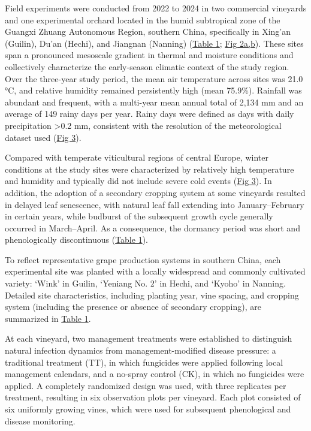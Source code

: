 \documentclass[
]{article}
\begin{document}
Field experiments were conducted from 2022 to 2024 in two commercial
vineyards and one experimental orchard located in the humid subtropical
zone of the Guangxi Zhuang Autonomous Region, southern China,
specifically in Xing'an (Guilin), Du'an (Hechi), and Jiangnan (Nanning)
(\hyperref[_Ref222580265]{Table 1}; \hyperref[_Ref212629919]{Fig
2a,b}). These sites span a pronounced
mesoscale gradient in thermal and moisture conditions and collectively
characterize the early-season climatic context of the study region. Over
the three-year study period, the mean air temperature across sites was
21.0 °C, and relative humidity remained persistently high (mean 75.9\%).
Rainfall was abundant and frequent, with a multi-year mean annual total
of 2,134 mm and an average of 149 rainy days per year. Rainy days were
defined as days with daily precipitation \textgreater0.2 mm, consistent
with the resolution of the meteorological dataset used
(\hyperref[_Ref214271335]{Fig 3}).

Compared with temperate viticultural regions of central Europe, winter
conditions at the study sites were characterized by relatively high
temperature and humidity and typically did not include severe cold
events (\hyperref[_Ref214271335]{Fig 3}). In addition, the adoption of a
secondary cropping system at some vineyards resulted in delayed leaf
senescence, with natural leaf fall extending into January--February in
certain years, while budburst of the subsequent growth cycle generally
occurred in March--April. As a consequence, the dormancy period was
short and phenologically discontinuous (\hyperref[_Ref222580265]{Table
1}).

To reflect representative grape production systems in southern China,
each experimental site was planted with a locally widespread and
commonly cultivated variety: `Wink' in Guilin, `Yeniang No. 2' in Hechi,
and `Kyoho' in Nanning. Detailed site characteristics, including
planting year, vine spacing, and cropping system (including the presence
or absence of secondary cropping), are summarized in
\hyperref[_Ref222580265]{Table 1}.

At each vineyard, two management treatments were established to
distinguish natural infection dynamics from management-modified disease
pressure: a traditional treatment (TT), in which fungicides were applied
following local management calendars, and a no-spray control (CK), in
which no fungicides were applied. A completely randomized design was
used, with three replicates per treatment, resulting in six observation
plots per vineyard. Each plot consisted of six uniformly growing vines,
which were used for subsequent phenological and disease monitoring.
\end{document}
